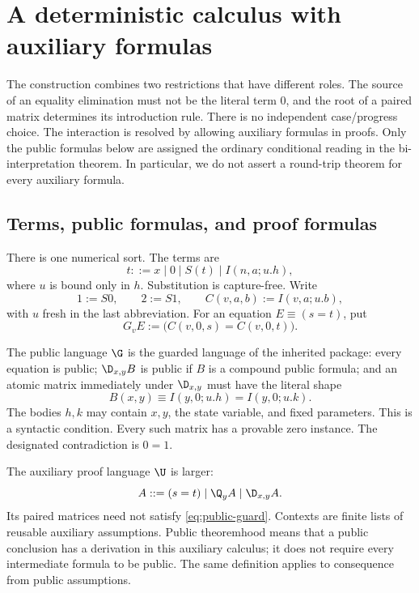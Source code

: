 \section{A deterministic calculus with auxiliary formulas}
\label{sec:composition}

The construction combines two restrictions that have different roles.  The
source of an equality elimination must not be the literal term $0$, and the
root of a paired matrix determines its introduction rule.  There is no
independent case/progress choice.  The interaction is resolved by allowing
auxiliary formulas in proofs.  Only the public formulas below are assigned
the ordinary conditional reading in the bi-interpretation theorem.  In
particular, we do not assert a round-trip theorem for every auxiliary
formula.

\subsection{Terms, public formulas, and proof formulas}

There is one numerical sort.  The terms are
\[
 t ::= x\mid 0\mid S(t)\mid I(n,a;u.h),
\]
where $u$ is bound only in $h$.  Substitution is capture-free.  Write
\[
 1:=S0,\qquad 2:=S1,\qquad C(v,a,b):=I(v,a;u.b),
\]
with $u$ fresh in the last abbreviation.  For an equation $E\equiv(s=t)$,
put
\[
 G_v E := \bigl(C(v,0,s)=C(v,0,t)\bigr).
\]

The public language $\G$ is the guarded language of the inherited package:
every equation is public; $\D_{x,y}B$ is public if $B$ is a compound public
formula; and an atomic matrix immediately under $\D_{x,y}$ must have the
literal shape
\begin{equation}
 B(x,y)\equiv I(y,0;u.h)=I(y,0;u.k).
 \tag{G}\label{eq:public-guard}
\end{equation}
The bodies $h,k$ may contain $x,y$, the state variable, and fixed
parameters.  This is a syntactic condition.  Every such matrix has a
provable zero instance.  The designated contradiction is $0=1$.

The auxiliary proof language $\U$ is larger:
\[
 A ::= (s=t)\mid\Q_y A\mid\D_{x,y}A.
\]
Its paired matrices need not satisfy \eqref{eq:public-guard}.  Contexts are
finite lists of reusable auxiliary assumptions.  Public theoremhood means
that a public conclusion has a derivation in this auxiliary calculus; it
does not require every intermediate formula to be public.  The same
definition applies to consequence from public assumptions.


